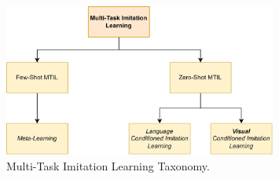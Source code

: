 \begin{figure}[t]
    \centering
    \includegraphics[width=0.8\textwidth]{figures/images/MTIL_taxonomy.jpg}
    \caption{Multi-Task Imitation Learning Taxonomy.}
    \label{fig:mtil_taxonomy}
    
\end{figure}
